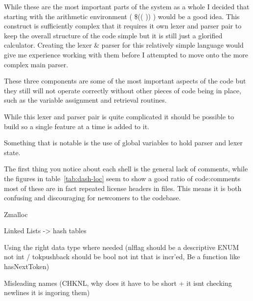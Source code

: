 While these are the most important parts of the system as a whole I decided that starting with the arithmetic environment ( \$(( )) ) would be a good idea.
This construct is sufficiently complex that it requires it own lexer and parser pair to keep the overall structure of the code simple but it is still just a glorified calculator.
Creating the lexer \& parser for this relatively simple language would give me experience working with them before I attempted to move onto the more complex main parser.


These three components are some of the most important aspects of the code but they still will not operate correctly without other pieces of code being in place, such as the variable assignment and retrieval routines.

While this lexer and parser pair is quite complicated it should be possible to build so a single feature at a time is added to it.

Something that is notable is the use of global variables to hold parser and lexer state.

The first thing you notice about each shell is the general lack of comments, while the figures in table~\ref{tab:dash-loc} seem to show a good ratio of code:comments most of these are in fact repeated license headers in files.
This means it is both confusing and discouraging for newcomers to the codebase. 



Zmalloc

Linked Lists -> hash tables

Using the right data type where needed (nlflag should be a descriptive ENUM not int / tokpushback should be bool not int that is incr'ed, Be a function like hasNextToken)

Misleading names (CHKNL, why does it have to be short + it isnt checking newlines it is ingoring them)





